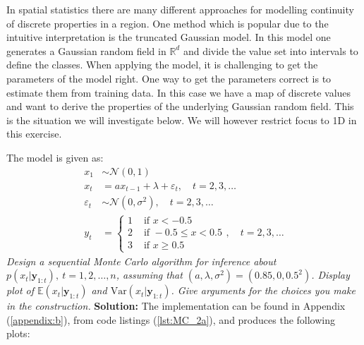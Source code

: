 In spatial statistics there are many different approaches
for modelling continuity of discrete properties in a region. One method which is popular due
to the intuitive interpretation is the truncated Gaussian model. In this model one generates a
Gaussian random field in $\mathbb{R}^d$ and divide the value set into intervals to define the classes. When applying the model, it is challenging to get the parameters of the model right. One way to get the parameters correct is to estimate them from training data. In this case we have a map of discrete values and want to derive the properties of the underlying Gaussian random field. This is the situation we will investigate below. We will however restrict focus to 1D in this exercise.

The model is given as:
\begin{align}
    x_1 &\sim \mathcal{N}(0,1) \\[5pt] 
    x_t &= ax_{t-1} + \lambda + \varepsilon_t, \quad t = 2, 3, \ldots \\[5pt]
    \varepsilon_t &\sim \mathcal{N}(0, \sigma^2), \quad t = 2,3, \ldots \\[5pt] 
    y_t &= 
    \begin{cases}
        1  &\text{ if } x < -0.5 \\[5pt]
        2  &\text{ if } -0.5 \leq x < 0.5 \\[5pt]
        3  &\text{ if } x \geq 0.5 
    \end{cases}
    ,\quad t = 2,3, \ldots
\end{align}
\emph{Design a sequential Monte Carlo algorithm for inference about $p(x_t | \boldsymbol{y}_{1:t}), \ t= 1, 2, \ldots, n$, assuming that $(a, \lambda, \sigma^2) = (0.85, 0, 0.5^2)$. Display plot of $\mathbb{E}(x_t | \boldsymbol{y}_{1:t})$ and $\text{Var}(x_t | \boldsymbol{y}_{1:t})$. Give arguments for the choices you make in the construction.} \spaze
\textbf{Solution:} \spaze
The implementation can be found in Appendix (\ref{appendix:b}), from code listings (\ref{lst:MC_2a}), and produces the following plots: 
